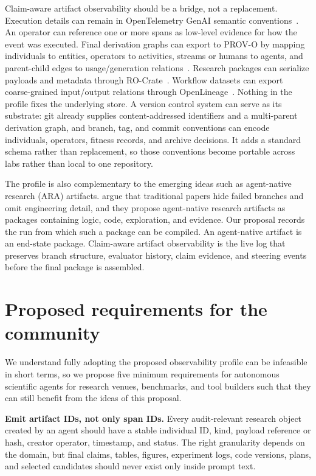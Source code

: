 \documentclass{article}
\begin{document}
Claim-aware artifact observability should be a bridge, not a replacement. Execution details can remain in OpenTelemetry GenAI semantic conventions~\citep{otelgenai}. An operator can reference one or more spans as low-level evidence for how the event was executed. Final derivation graphs can export to PROV-O by mapping individuals to entities, operators to activities, streams or humans to agents, and parent-child edges to usage/generation relations~\citep{provo,provdm}. Research packages can serialize payloads and metadata through RO-Crate~\citep{rocrate}. Workflow datasets can export coarse-grained input/output relations through OpenLineage~\citep{openlineage}. Nothing in the profile fixes the underlying store. A version control system can serve as its substrate: git already supplies content-addressed identifiers and a multi-parent derivation graph, and branch, tag, and commit conventions can encode individuals, operators, fitness records, and archive decisions. It adds a standard schema rather than replacement, so those conventions become portable across labs rather than local to one repository.

The profile is also complementary to the emerging ideas such as agent-native research (ARA) artifacts. \citet{liu2026ara} argue that traditional papers hide failed branches and omit engineering detail, and they propose agent-native research artifacts as packages containing logic, code, exploration, and evidence. Our proposal records the run from which such a package can be compiled. An agent-native artifact is an end-state package. Claim-aware artifact observability is the live log that preserves branch structure, evaluator history, claim evidence, and steering events before the final package is assembled.

\section{Proposed requirements for the community}

We understand fully adopting the proposed observability profile can be infeasible in short terms, so we propose five minimum requirements for autonomous scientific agents for research venues, benchmarks, and tool builders such that they can still benefit from the ideas of this proposal.

\textbf{Emit artifact IDs, not only span IDs.} Every audit-relevant research object created by an agent should have a stable individual ID, kind, payload reference or hash, creator operator, timestamp, and status. The right granularity depends on the domain, but final claims, tables, figures, experiment logs, code versions, plans, and selected candidates should never exist only inside prompt text.
\end{document}

